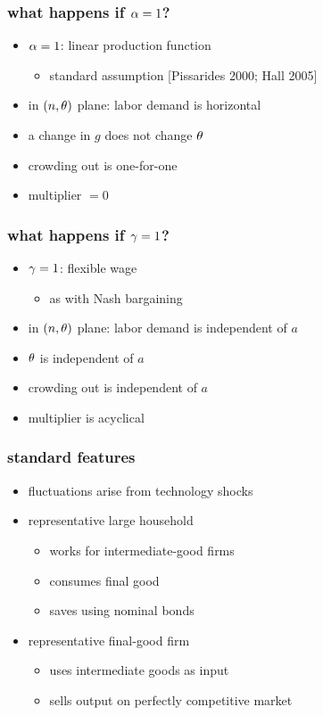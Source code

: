 \documentclass[12pt,xcolor={dvipsnames},hyperref={pdftex,pdfpagemode=UseNone,hidelinks,pdfdisplaydoctitle=true},usepdftitle=false]{beamer}
\begin{document}
\begin{frame}
\frametitle{what happens if $\alpha=1$?}
\begin{itemize}
\item $\alpha=1$: linear production function
\begin{itemize}
\item standard assumption [Pissarides 2000; Hall 2005]
\end{itemize}
\item in $(n,\theta)$ plane: labor demand is horizontal
\item[\then] a change in $g$ does not change $\theta$
\item[\then] crowding out is one-for-one
\item[\then]  multiplier $=0$
\end{itemize}
\end{frame}

\begin{frame}
\frametitle{what happens if $\gamma=1$?}
\begin{itemize}
\item $\gamma=1$: flexible wage
\begin{itemize}
\item as with Nash bargaining
\end{itemize}
\item in $(n,\theta)$ plane: labor demand is independent of $a$
\item[\then] $\theta$ is independent of $a$
\item[\then] crowding out is independent of $a$
\item[\then] multiplier is acyclical
\end{itemize}
\end{frame}

\begin{frame}
\end{frame}


\begin{frame}
\frametitle{standard features}
\begin{itemize}
\item fluctuations arise from technology shocks
\item representative large household 
\begin{itemize}
\item works for intermediate-good firms
\item consumes final good
\item saves using nominal bonds
\end{itemize}
\item representative final-good firm
\begin{itemize}
\item uses intermediate goods as input
\item sells output on perfectly competitive market
\end{itemize}
\end{itemize}
\end{frame}
\end{document}
